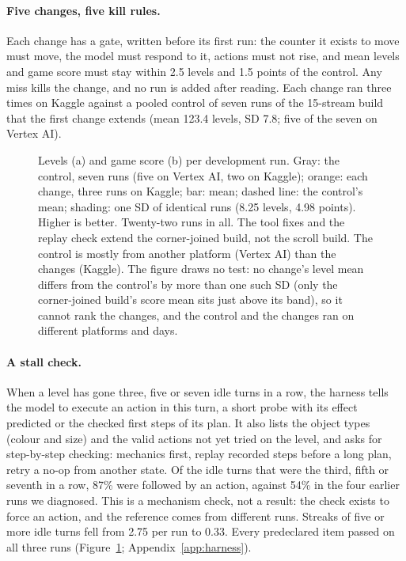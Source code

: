 \paragraph{Five changes, five kill rules.}
Each change has a gate, written before its first run: the counter it exists to move must move, the model must respond to it, actions must not rise, and mean levels and game score must stay within 2.5 levels and 1.5 points of the control. %
Any miss kills the change, and no run is added after reading.
Each change ran three times on Kaggle against a pooled control of seven runs of the 15-stream build that the first change extends (mean 123.4 levels, SD 7.8; five of the seven on Vertex AI). %

\begin{figure}[t]
\centering
{}
\caption{Levels (a) and game score (b) per development run. Gray: the control, seven runs (five on Vertex AI, two on Kaggle); orange: each change, three runs on Kaggle; bar: mean; dashed line: the control's mean; shading: one SD of identical runs (8.25 levels, 4.98 points). Higher is better. Twenty-two runs in all. The tool fixes and the replay check extend the corner-joined build, not the scroll build. The control is mostly from another platform (Vertex AI) than the changes (Kaggle). The figure draws no test: no change's level mean differs from the control's by more than one such SD (only the corner-joined build's score mean sits just above its band), so it cannot rank the changes, and the control and the changes ran on different platforms and days.}\label{fig:gates} %
\end{figure}

\paragraph{A stall check.}
When a level has gone three, five or seven idle turns in a row, the harness tells the model to execute an action in this turn, a short probe with its effect predicted or the checked first steps of its plan. %
It also lists the object types (colour and size) and the valid actions not yet tried on the level, and asks for step-by-step checking: mechanics first, replay recorded steps before a long plan, retry a no-op from another state. %
Of the idle turns that were the third, fifth or seventh in a row, 87\% were followed by an action, against 54\% in the four earlier runs we diagnosed. This is a mechanism check, not a result: the check exists to force an action, and the reference comes from different runs. %
Streaks of five or more idle turns fell from 2.75 per run to 0.33. %
Every predeclared item passed on all three runs (Figure~\ref{fig:gates}; Appendix~\ref{app:harness}). %

